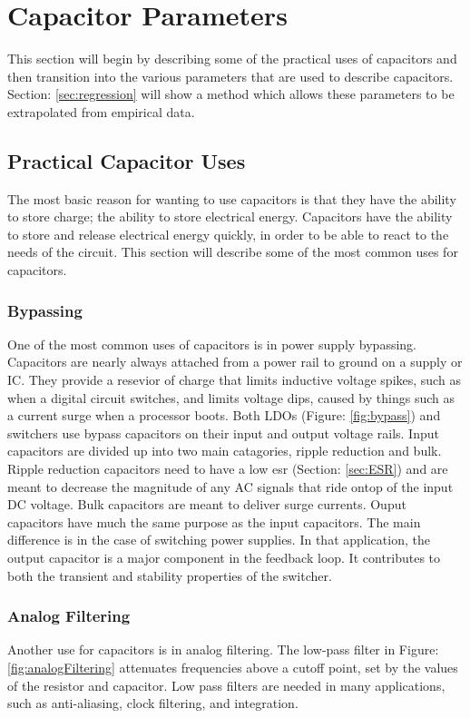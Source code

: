 \section {Capacitor Parameters}
This section will begin by describing some of the practical uses of capacitors and then transition into the various parameters that are used to describe capacitors. Section: \ref{sec:regression} will show a method which allows these parameters to be extrapolated from empirical data.

\subsection{Practical Capacitor Uses}

The most basic reason for wanting to use capacitors is that they  have the ability to store charge; the ability to store electrical energy. Capacitors have the ability to store and release electrical energy quickly, in order to be able to react to the needs of the circuit. This section will describe some of the most common uses for capacitors.

\subsubsection{Bypassing}


One of the most common uses of capacitors is in power supply bypassing. Capacitors are nearly always attached from a power rail to ground on a supply or IC. They provide a resevior of charge that limits inductive voltage spikes, such as when a digital circuit switches, and limits voltage dips, caused by things such as a current surge when a processor boots.
Both LDOs (Figure: \ref{fig:bypass}) and switchers use bypass capacitors on their input and output voltage rails. Input capacitors are divided up into two main catagories, ripple reduction and bulk. Ripple reduction capacitors need to have a low \gls{esr} (Section: \ref{sec:ESR}) and are meant to decrease the magnitude of any AC signals that ride ontop of the input DC voltage. Bulk capacitors are meant to deliver surge currents. Ouput capacitors have much the same purpose as the input capacitors. The main difference is in the case of switching power supplies. In that application, the output capacitor is a major component in the feedback loop. It contributes to both the transient and stability properties of the switcher.

\subsubsection{Analog Filtering}

Another use for capacitors is in analog filtering. The low-pass filter in Figure: \ref{fig:analogFiltering} attenuates frequencies above a cutoff point, set by the values of the resistor and capacitor. Low pass filters are needed in many applications, such as anti-aliasing, clock filtering, and integration.

